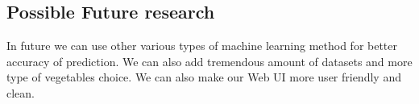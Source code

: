 \subsection{Possible Future research}
In future we can use other various types of machine learning method for better accuracy of prediction. We can also add tremendous amount of datasets and more type of vegetables choice. We can also make our Web UI more user friendly and clean.   


\renewcommand\bibname{References} %



